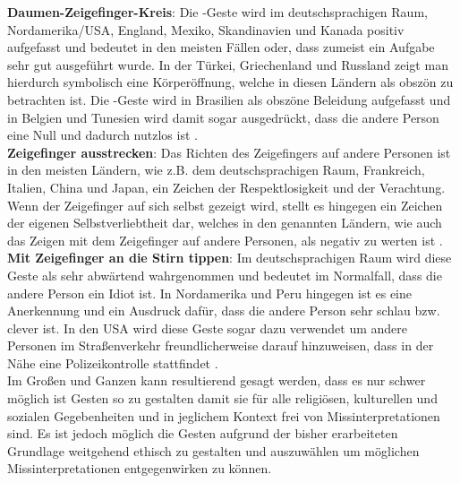 \textbf{Daumen-Zeigefinger-Kreis}: Die -Geste wird im deutschsprachigen Raum, Nordamerika/USA, England, Mexiko, Skandinavien und Kanada positiv aufgefasst und bedeutet in den meisten Fällen  oder, dass zumeist ein Aufgabe sehr gut ausgeführt wurde. In der Türkei, Griechenland und Russland zeigt man hierdurch symbolisch eine Körperöffnung, welche in diesen Ländern als obszön zu betrachten ist. Die -Geste wird in Brasilien als obszöne Beleidung aufgefasst und in Belgien und Tunesien wird damit sogar ausgedrückt, dass die andere Person eine Null und dadurch nutzlos ist \cite{handzeichen_gesten_2018}.\\

\textbf{Zeigefinger ausstrecken}: Das Richten des Zeigefingers auf andere Personen ist in den meisten Ländern, wie z.B. dem deutschsprachigen Raum, Frankreich, Italien, China und Japan, ein Zeichen der Respektlosigkeit und der Verachtung. Wenn der Zeigefinger auf sich selbst gezeigt wird, stellt es hingegen ein Zeichen der eigenen Selbstverliebtheit dar, welches in den genannten Ländern, wie auch das Zeigen mit dem Zeigefinger auf andere Personen, als negativ zu werten ist \cite{gesten_vergleich_nodate}.\\

\textbf{Mit Zeigefinger an die Stirn tippen}: Im deutschsprachigen Raum wird diese Geste als sehr abwärtend wahrgenommen und bedeutet im Normalfall, dass die andere Person ein Idiot ist. In Nordamerika und Peru hingegen ist es eine Anerkennung und ein Ausdruck dafür, dass die andere Person sehr schlau bzw. clever ist. In den USA wird diese Geste sogar dazu verwendet um andere Personen im Straßenverkehr freundlicherweise darauf hinzuweisen, dass in der Nähe eine Polizeikontrolle stattfindet \cite{handzeichen_gesten_2018}.\\

Im Großen und Ganzen kann resultierend gesagt werden, dass es nur schwer möglich ist Gesten so zu gestalten damit sie für alle religiösen, kulturellen und sozialen Gegebenheiten und in jeglichem Kontext frei von Missinterpretationen sind. Es ist jedoch möglich die Gesten aufgrund der bisher erarbeiteten Grundlage weitgehend ethisch zu gestalten und auszuwählen um möglichen Missinterpretationen entgegenwirken zu können.


